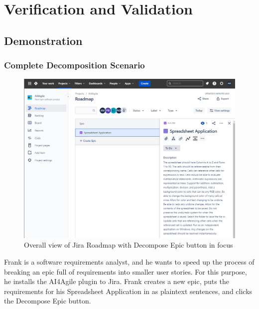 \section{Verification and Validation}

\subsection{Demonstration}

\subsubsection{Complete Decomposition Scenario}
\begin{figure}
\centerline{\includegraphics[width=\textwidth,height=\textheight,keepaspectratio]{./figure/Scenario1Figure1.png}}
\caption{Overall view of Jira Roadmap with Decompose Epic button in focus}
\end{figure}

Frank is a software requirements analyst, and he wants to speed up the process of breaking an epic full of requirements into smaller user stories. For this purpose, he installs the AI4Agile plugin to Jira. Frank creates a new epic, puts the requirements for his Spreadsheet Application in as plaintext sentences, and clicks the Decompose Epic button.

